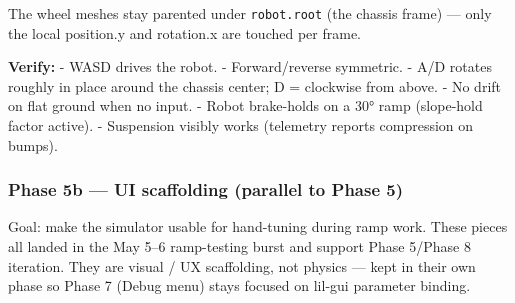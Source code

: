 \documentclass[
]{article}
\begin{document}
The wheel meshes stay parented under \texttt{robot.root} (the chassis
frame) --- only the local position.y and rotation.x are touched per
frame.

\textbf{Verify:} - WASD drives the robot. - Forward/reverse symmetric. -
A/D rotates roughly in place around the chassis center; D = clockwise
from above. - No drift on flat ground when no input. - Robot brake-holds
on a 30° ramp (slope-hold factor active). - Suspension visibly works
(telemetry reports compression on bumps).

\subsubsection{Phase 5b --- UI scaffolding (parallel to Phase
5)}\label{phase-5b-ui-scaffolding-parallel-to-phase-5}

Goal: make the simulator usable for hand-tuning during ramp work. These
pieces all landed in the May 5--6 ramp-testing burst and support Phase
5/Phase 8 iteration. They are visual / UX scaffolding, not physics ---
kept in their own phase so Phase 7 (Debug menu) stays focused on lil-gui
parameter binding.
\end{document}
